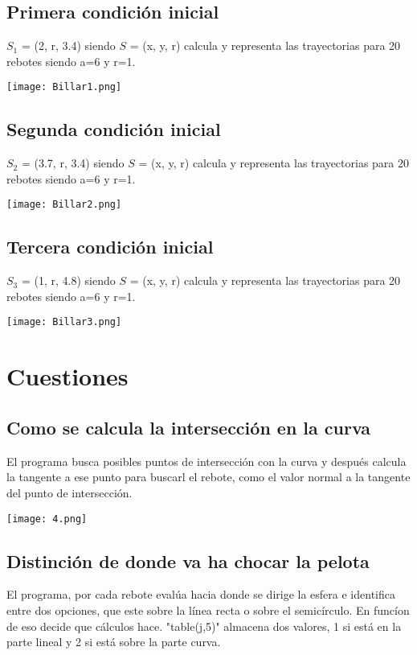 \documentclass{article}
\begin{document}
\subsection{Primera condición inicial}
$S_1$ = (2, r, 3.4) siendo $S$ = (x, y, r) calcula y representa las trayectorias para 20 rebotes siendo a=6 y r=1.
\begin{center}
        \texttt{[image: Billar1.png]}
\end{center}

\subsection{Segunda condición inicial}
$S_2$ = (3.7, r, 3.4) siendo $S$ = (x, y, r) calcula y representa las trayectorias para 20 rebotes siendo a=6 y r=1.
\begin{center}
        \texttt{[image: Billar2.png]}
\end{center}

\subsection{Tercera condición inicial}
$S_3$ = (1, r, 4.8) siendo $S$ = (x, y, r) calcula y representa las trayectorias para 20 rebotes siendo a=6 y r=1.
\begin{center}
        \texttt{[image: Billar3.png]}
\end{center}


\section{Cuestiones}
\subsection{Como se calcula la intersección en la curva}
El programa busca posibles puntos de intersección con la curva y después calcula la tangente a ese punto para buscarl el rebote, como el valor normal a la tangente del punto de intersección.
\begin{center}
        \texttt{[image: 4.png]}
\end{center}

\newpage

\subsection{Distinción de donde va ha chocar la pelota}
El programa, por cada rebote evalúa hacia donde se dirige la esfera e identifica entre dos opciones, que este sobre la línea recta o sobre el semicírculo. En funcíon de eso decide que cálculos hace. "table(j,5)" almacena dos valores, 1 si está en la parte lineal y 2 si está sobre la parte curva.
\\
\end{document}

